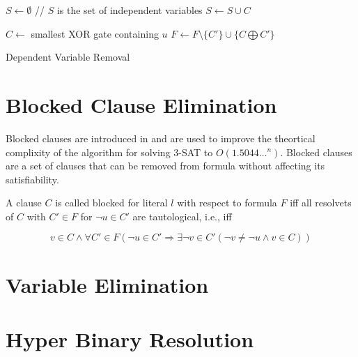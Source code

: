 \begin{algorithm}[h]
  \begin{algorithmic}

    \STATE $S \gets \emptyset$ // $S$ is the set of independent variables
      \STATE $S \gets S \cup C$
    \ENDFOR

        \STATE $C \gets$ smallest XOR gate containing $u$
          \STATE $F \gets F \setminus \{C'\} \cup \{C \bigoplus C'\}$
        \ENDFOR
      \ENDIF
    \ENDFOR
  \end{algorithmic}

  \caption{Dependent Variable Removal}
  \label{alg:hyper-resolution}
\end{algorithm}


\section{Blocked Clause Elimination}

Blocked clauses are introduced in
\cite{Kullmann:1999:NMD:312269.312271} and are used to improve
the theortical complixity of the algorithm for solving 3-SAT to
$O(1.5044\ldots^n)$. Blocked clauses are a set of clauses that can
be removed from formula without affecting its satisfiability.


\begin{mydef}A clause $C$ is called blocked for literal $l$ with
respect to formula $F$ iff all resolvets of $C$ with $C' \in F$
for $\neg u \in C'$ are tautological, i.e., iff

\[
  v \in C \land \forall C' \in F (\neg u \in C' \Rightarrow \exists \neg v \in C'
  (\neg v \not = \neg u \land v \in C))
\]
\end{mydef}

\section{Variable Elimination}

\section{Hyper Binary Resolution}

